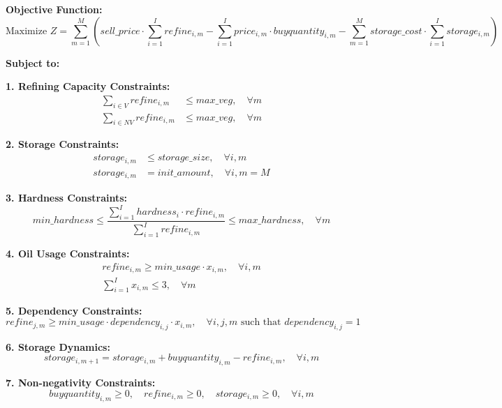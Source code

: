 \documentclass{article}
\begin{document}
\textbf{Objective Function:}
\[
\text{Maximize } Z = \sum_{m=1}^{M} \left( sell\_price \cdot \sum_{i=1}^{I} refine_{i,m} - \sum_{i=1}^{I} price_{i,m} \cdot buyquantity_{i,m} - \sum_{m=1}^{M} storage\_cost \cdot \sum_{i=1}^{I} storage_{i,m} \right)
\]

\textbf{Subject to:}

\textbf{1. Refining Capacity Constraints:}
\[
\begin{align*}
\sum_{i \in V} refine_{i,m} & \leq max\_veg, \quad \forall m \\
\sum_{i \in NV} refine_{i,m} & \leq max\_veg, \quad \forall m 
\end{align*}
\]

\textbf{2. Storage Constraints:}
\[
\begin{align*}
storage_{i,m} & \leq storage\_size, \quad \forall i, m \\
storage_{i,m} & = init\_amount, \quad \forall i, m=M 
\end{align*}
\]

\textbf{3. Hardness Constraints:}
\[
min\_hardness \leq \frac{\sum_{i=1}^{I} hardness_{i} \cdot refine_{i,m}}{\sum_{i=1}^{I} refine_{i,m}} \leq max\_hardness, \quad \forall m
\]

\textbf{4. Oil Usage Constraints:}
\[
\begin{align*}
refine_{i,m} \geq min\_usage \cdot x_{i,m}, \quad \forall i, m \\
\sum_{i=1}^{I} x_{i,m} \leq 3, \quad \forall m
\end{align*}
\]

\textbf{5. Dependency Constraints:}
\[
refine_{j,m} \geq min\_usage \cdot dependency_{i,j} \cdot x_{i,m}, \quad \forall i,j,m \text{ such that } dependency_{i,j} = 1
\]

\textbf{6. Storage Dynamics:}
\[
storage_{i,m+1} = storage_{i,m} + buyquantity_{i,m} - refine_{i,m}, \quad \forall i, m 
\]

\textbf{7. Non-negativity Constraints:}
\[
buyquantity_{i,m} \geq 0, \quad refine_{i,m} \geq 0, \quad storage_{i,m} \geq 0, \quad \forall i,m
\]
\end{document}
